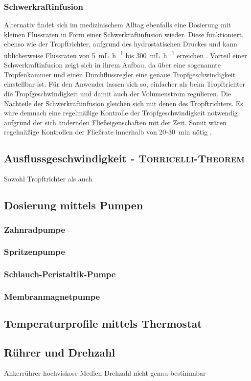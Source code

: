 \subsubsection*{Schwerkraftinfusion}
Alternativ findet sich im medizinischem Alltag ebenfalls eine Dosierung mit kleinen Flussraten in Form einer Schwerkraftinfusion wieder. Diese funktioniert, ebenso wie der Tropftrichter, aufgrund des hydrostatischen Druckes und kann üblicherweise Flussraten von \SI{5}{\milli \liter \per \hour} bis \SI{300}{\milli \liter \per \hour} erreichen \cite{pfm_medical}.
Vorteil einer Schwerkraftinfusion zeigt sich in ihrem Aufbau, da über eine sogenannte Tropfenkammer und einen Durchflussregler eine genaue Tropfgeschwindigkeit einstellbar ist. Für den Anwender lassen sich so, einfacher als beim Tropftrichter die Tropfgeschwindigkeit und damit auch der Volumenstrom regulieren.
Die Nachteile der Schwerkraftinfusion gleichen sich mit denen des Tropftrichters. Es wäre demnach eine regelmäßige Kontrolle der Tropfgeschwindigkeit notwendig aufgrund der sich ändernden Fließeigenschaften mit der Zeit. Somit wären regelmäßige Kontrollen der Fließrate innerhalb von 20-\SI{30}{\minute} nötig \cite{OnlinePortalfurprofessionellPflegende.06.03.2017}.

\subsection{Ausflussgeschwindigkeit - \textsc{Torricelli-Theorem}}
\label{sec:torricelli}
Sowohl Tropftrichter als auch 

\subsection{Dosierung mittels Pumpen}
\subsubsection*{Zahnradpumpe}
\subsubsection*{Spritzenpumpe}
\subsubsection*{Schlauch-Peristaltik-Pumpe}
\subsubsection*{Membranmagnetpumpe}

\subsection{Temperaturprofile mittels Thermostat}

\subsection{Rührer und Drehzahl}
Ankerrührer hochviskose Medien
Drehzahl nicht genau bestimmbar